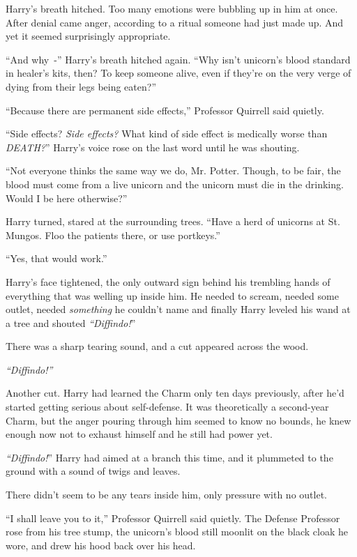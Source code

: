 Harry's breath hitched. Too many emotions were bubbling up in him at once. After denial came anger, according to a ritual someone had just made up. And yet it seemed surprisingly appropriate.

``And why~-'' Harry's breath hitched again. ``Why isn't unicorn's blood standard in healer's kits, then? To keep someone alive, even if they're on the very verge of dying from their legs being eaten?''

``Because there are permanent side effects,'' Professor Quirrell said quietly.

``Side effects? \emph{Side effects?} What kind of side effect is medically worse than \emph{DEATH?}'' Harry's voice rose on the last word until he was shouting.

``Not everyone thinks the same way we do, Mr. Potter. Though, to be fair, the blood must come from a live unicorn and the unicorn must die in the drinking. Would I be here otherwise?''

Harry turned, stared at the surrounding trees. ``Have a herd of unicorns at St. Mungos. Floo the patients there, or use portkeys.''

``Yes, that would work.''

Harry's face tightened, the only outward sign behind his trembling hands of everything that was welling up inside him. He needed to scream, needed some outlet, needed \emph{something} he couldn't name and finally Harry leveled his wand at a tree and shouted \emph{``Diffindo!}''

There was a sharp tearing sound, and a cut appeared across the wood.

\emph{``Diffindo!''}

Another cut. Harry had learned the Charm only ten days previously, after he'd started getting serious about self-defense. It was theoretically a second-year Charm, but the anger pouring through him seemed to know no bounds, he knew enough now not to exhaust himself and he still had power yet.

\emph{``Diffindo!}'' Harry had aimed at a branch this time, and it plummeted to the ground with a sound of twigs and leaves.

There didn't seem to be any tears inside him, only pressure with no outlet.

``I shall leave you to it,'' Professor Quirrell said quietly. The Defense Professor rose from his tree stump, the unicorn's blood still moonlit on the black cloak he wore, and drew his hood back over his head.
